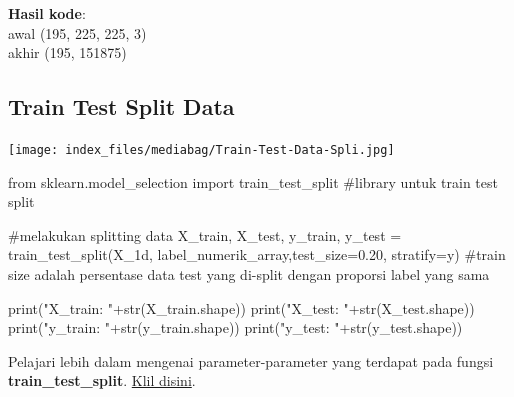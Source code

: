 \documentclass[
  letterpaper,
  DIV=11,
  numbers=noendperiod]{scrreprt}
\newenvironment{Shaded}{\begin{snugshade}}{\end{snugshade}}
\newcommand{\BuiltInTok}[1]{\textcolor[rgb]{0.00,0.23,0.31}{#1}}
\newcommand{\CommentTok}[1]{\textcolor[rgb]{0.37,0.37,0.37}{#1}}
\newcommand{\FloatTok}[1]{\textcolor[rgb]{0.68,0.00,0.00}{#1}}
\newcommand{\ImportTok}[1]{\textcolor[rgb]{0.00,0.46,0.62}{#1}}
\newcommand{\NormalTok}[1]{\textcolor[rgb]{0.00,0.23,0.31}{#1}}
\newcommand{\OperatorTok}[1]{\textcolor[rgb]{0.37,0.37,0.37}{#1}}
\newcommand{\StringTok}[1]{\textcolor[rgb]{0.13,0.47,0.30}{#1}}
\begin{document}
\textbf{Hasil kode}:\\
awal (195, 225, 225, 3)\\
akhir (195, 151875)

\hypertarget{train-test-split-data}{%
\subsection*{Train Test Split Data}\label{train-test-split-data}}

\texttt{[image: index\_files/mediabag/Train-Test-Data-Spli.jpg]}

\begin{Shaded}
\begin{Highlighting}[]
\ImportTok{from}\NormalTok{ sklearn.model\_selection }\ImportTok{import}\NormalTok{ train\_test\_split }\CommentTok{\#library untuk train test split}

\CommentTok{\#melakukan splitting data}
\NormalTok{X\_train, X\_test, y\_train, y\_test }\OperatorTok{=}\NormalTok{ train\_test\_split(X\_1d, label\_numerik\_array,test\_size}\OperatorTok{=}\FloatTok{0.20}\NormalTok{, stratify}\OperatorTok{=}\NormalTok{y) }
\CommentTok{\#train size adalah persentase data test yang di{-}split dengan proporsi label yang sama}

\BuiltInTok{print}\NormalTok{(}\StringTok{"X\_train: "}\OperatorTok{+}\BuiltInTok{str}\NormalTok{(X\_train.shape))}
\BuiltInTok{print}\NormalTok{(}\StringTok{"X\_test: "}\OperatorTok{+}\BuiltInTok{str}\NormalTok{(X\_test.shape))}
\BuiltInTok{print}\NormalTok{(}\StringTok{"y\_train: "}\OperatorTok{+}\BuiltInTok{str}\NormalTok{(y\_train.shape))}
\BuiltInTok{print}\NormalTok{(}\StringTok{"y\_test: "}\OperatorTok{+}\BuiltInTok{str}\NormalTok{(y\_test.shape))}
\end{Highlighting}
\end{Shaded}

\begin{tcolorbox}[enhanced jigsaw, opacityback=0, colbacktitle=quarto-callout-tip-color!10!white, breakable, titlerule=0mm, left=2mm, toptitle=1mm, rightrule=.15mm, leftrule=.75mm, colback=white, opacitybacktitle=0.6, arc=.35mm, toprule=.15mm, coltitle=black, colframe=quarto-callout-tip-color-frame, bottomtitle=1mm, title=\textcolor{quarto-callout-tip-color}{\faLightbulb}\hspace{0.5em}{Tip}, bottomrule=.15mm]

Pelajari lebih dalam mengenai parameter-parameter yang terdapat pada
fungsi \textbf{train\_test\_split}.
\href{https://scikit-learn.org/stable/modules/generated/sklearn.model_selection.train_test_split.html}{Klil
disini}.

\end{tcolorbox}
\end{document}
